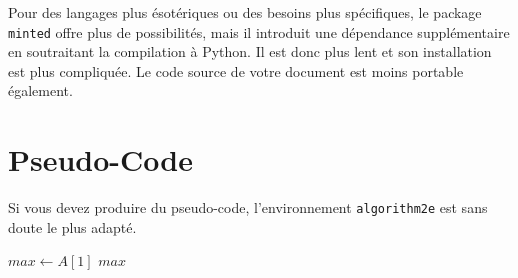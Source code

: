 Pour des langages plus ésotériques ou des besoins plus spécifiques, le
package \texttt{minted} offre plus de possibilités, mais il introduit
une dépendance supplémentaire en soutraitant la compilation à
Python. Il est donc plus lent et son installation est plus
compliquée. Le code source de votre document est moins portable
également.
 
 \section{Pseudo-Code}

 Si vous devez produire du pseudo-code, l'environnement
 \texttt{algorithm2e} est sans doute le plus adapté.

 \begin{algorithm}[H]
\DontPrintSemicolon
{}
$max \leftarrow A[1]$\;
\Return $max$\;
\caption{Recherche du maximum dans un tableau}
\end{algorithm}